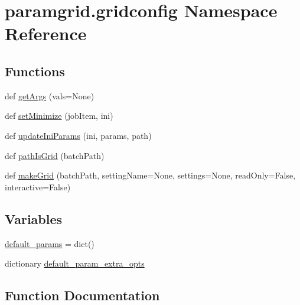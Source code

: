 \hypertarget{namespaceparamgrid_1_1gridconfig}{}\section{paramgrid.\+gridconfig Namespace Reference}
\label{namespaceparamgrid_1_1gridconfig}
\subsection*{Functions}
\begin{DoxyCompactItemize}
\item 
def \mbox{\hyperlink{namespaceparamgrid_1_1gridconfig_ad2e22fa939610b2748ced8cad1e9104d}{get\+Args}} (vals=None)
\item 
def \mbox{\hyperlink{namespaceparamgrid_1_1gridconfig_a914c9c48fd66faa640b61db278b94e2a}{set\+Minimize}} (job\+Item, ini)
\item 
def \mbox{\hyperlink{namespaceparamgrid_1_1gridconfig_a56b6075773881b0ed15f57a591988ac0}{update\+Ini\+Params}} (ini, params, path)
\item 
def \mbox{\hyperlink{namespaceparamgrid_1_1gridconfig_a8b090aa6e31b89e92894db3c174a7c94}{path\+Is\+Grid}} (batch\+Path)
\item 
def \mbox{\hyperlink{namespaceparamgrid_1_1gridconfig_ade47bfa322320cd8ecb02b6a28bd17b9}{make\+Grid}} (batch\+Path, setting\+Name=None, settings=None, read\+Only=False, interactive=False)
\end{DoxyCompactItemize}
\subsection*{Variables}
\begin{DoxyCompactItemize}
\item 
\mbox{\hyperlink{namespaceparamgrid_1_1gridconfig_a4e4ed74bbba19e4d56533db835195e8c}{default\+\_\+params}} = dict()
\item 
dictionary \mbox{\hyperlink{namespaceparamgrid_1_1gridconfig_ad4156cd03619ab6116f9d6a24a33bb18}{default\+\_\+param\+\_\+extra\+\_\+opts}}
\end{DoxyCompactItemize}


\subsection{Function Documentation}
\mbox{\label{namespaceparamgrid_1_1gridconfig_ad2e22fa939610b2748ced8cad1e9104d}} 
